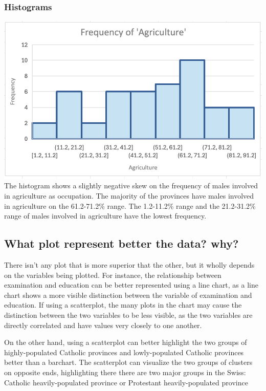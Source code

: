 \documentclass[
  letterpaper,
  DIV=11,
  numbers=noendperiod]{scrreprt}
\begin{document}
\subsubsection{Histograms}\label{histograms}

\includegraphics{./Excel_1_Unit/Week1_Janice/Week 1/Week 1 Wednesday/Swiss_histogram.png}
The histogram shows a slightly negative skew on the frequency of males
involved in agriculture as occupation. The majority of the provinces
have males involved in agriculture on the 61.2-71.2\% range. The
1.2-11.2\% range and the 21.2-31.2\% range of males involved in
agriculture have the lowest frequency.

\subsection{What plot represent better the data?
why?}\label{what-plot-represent-better-the-data-why}

There isn't any plot that is more superior that the other, but it wholly
depends on the variables being plotted. For instance, the relationship
between examination and education can be better represented using a line
chart, as a line chart shows a more visible distinction between the
variable of examination and education. If using a scatterplot, the many
plots in the chart may cause the distinction between the two variables
to be less visible, as the two variables are directly correlated and
have values very closely to one another.

On the other hand, using a scatterplot can better highlight the two
groups of highly-populated Catholic provinces and lowly-populated
Catholic provinces better than a barchart. The scatterplot can visualize
the two groups of clusters on opposite ends, highlighting there there
are two major groups in the Swiss: Catholic heavily-populated province
or Protestant heavily-populated province
\end{document}

